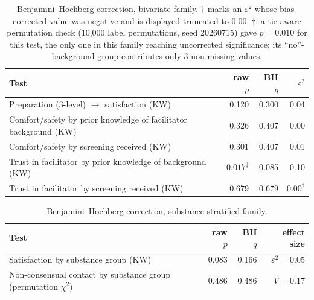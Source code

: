 \documentclass[12pt]{article}
\begin{document}
\begin{table}[htbp]
\centering
\caption{Benjamini--Hochberg correction, bivariate family. $\dagger$ marks an $\varepsilon^2$ whose
bias-corrected value was negative and is displayed truncated to 0.00. $\ddagger$: a tie-aware permutation
check (10,000 label permutations, seed 20260715) gave $p=0.010$ for this test, the only one in this family
reaching uncorrected significance; its ``no''-background group contributes only 3 non-missing values.}
\begin{tabular}{lrrr}
\toprule
Test & raw $p$ & BH $q$ & $\varepsilon^2$ \\
\midrule
Preparation (3-level) $\rightarrow$ satisfaction (KW) & 0.120 & 0.300 & 0.04 \\
Comfort/safety by prior knowledge of facilitator background (KW) & 0.326 & 0.407 & 0.00 \\
Comfort/safety by screening received (KW) & 0.301 & 0.407 & 0.01 \\
Trust in facilitator by prior knowledge of background (KW) & $0.017^{\ddagger}$ & 0.085 & 0.10 \\
Trust in facilitator by screening received (KW) & 0.679 & 0.679 & $0.00^{\dagger}$ \\
\bottomrule
\end{tabular}
\end{table}

\begin{table}[htbp]
\centering
\caption{Benjamini--Hochberg correction, substance-stratified family.}
\begin{tabular}{lrrr}
\toprule
Test & raw $p$ & BH $q$ & effect size \\
\midrule
Satisfaction by substance group (KW) & 0.083 & 0.166 & $\varepsilon^2=0.05$ \\
Non-consensual contact by substance group (permutation $\chi^2$) & 0.486 & 0.486 & $V=0.17$ \\
\bottomrule
\end{tabular}
\end{table}
\end{document}
